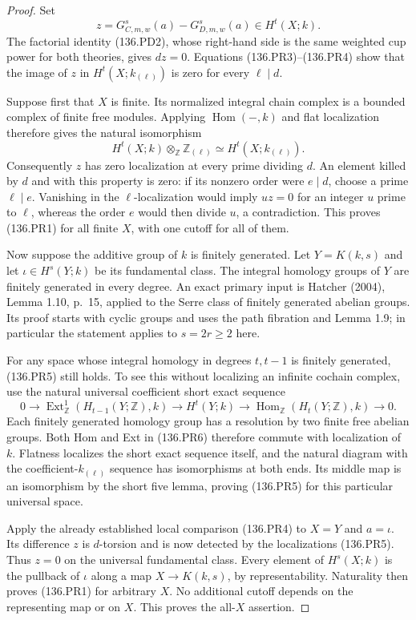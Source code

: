 \begin{proof}
Set
\[
                  z=G_{C,m,w}^{s}(a)-G_{D,m,w}^{s}(a)
                               \in H^t(X;k).
\]
The factorial identity (136.PD2), whose right-hand
side is the same weighted cup power for both
theories, gives $dz=0$. Equations (136.PR3)--(136.PR4)
show that the image of $z$ in
$H^t(X;k_{(\ell)})$ is zero for every $\ell\mid d$.

Suppose first that $X$ is finite. Its normalized
integral chain complex is a bounded complex of
finite free modules. Applying $\operatorname{Hom}(-,k)$
and flat localization therefore gives the natural
isomorphism
\[
 H^t(X;k)\otimes_{\mathbb Z}\mathbb Z_{(\ell)}
                         \simeq H^t(X;k_{(\ell)}).
                                                               \tag{136.PR5}
\]
Consequently $z$ has zero localization at every
prime dividing $d$. An element killed by $d$ and
with this property is zero: if its nonzero order
were $e\mid d$, choose a prime $\ell\mid e$.
Vanishing in the $\ell$-localization would imply
$u z=0$ for an integer $u$ prime to $\ell$, whereas
the order $e$ would then divide $u$, a contradiction.
This proves (136.PR1) for all finite $X$, with one
cutoff for all of them.

Now suppose the additive group of $k$ is finitely
generated. Let $Y=K(k,s)$ and let
$\iota\in H^s(Y;k)$ be its fundamental class.
The integral homology groups of $Y$ are finitely
generated in every degree. An exact primary input
is Hatcher (2004), Lemma 1.10, p.~15, applied to
the Serre class of finitely generated abelian
groups. Its proof starts with cyclic groups and
uses the path fibration and Lemma 1.9; in particular
the statement applies to $s=2r\ge2$ here.

For any space whose integral homology in degrees
$t,t-1$ is finitely generated, (136.PR5) still
holds. To see this without localizing an infinite
cochain complex, use the natural universal
coefficient short exact sequence
\[
 0\to\operatorname{Ext}_{\mathbb Z}^1(H_{t-1}(Y;\mathbb Z),k)
  \to H^t(Y;k)
  \to\operatorname{Hom}_{\mathbb Z}(H_t(Y;\mathbb Z),k)\to0.
                                                               \tag{136.PR6}
\]
Each finitely generated homology group has a
resolution by two finite free abelian groups.
Both Hom and Ext in (136.PR6) therefore commute
with localization of $k$. Flatness localizes the
short exact sequence itself, and the natural
diagram with the coefficient-$k_{(\ell)}$ sequence
has isomorphisms at both ends. Its middle map is
an isomorphism by the short five lemma, proving
(136.PR5) for this particular universal space.

Apply the already established local comparison
(136.PR4) to $X=Y$ and $a=\iota$. Its difference
$z$ is $d$-torsion and is now detected by the
localizations (136.PR5). Thus $z=0$ on the
universal fundamental class. Every element of
$H^s(X;k)$ is the pullback of $\iota$ along a map
$X\to K(k,s)$, by representability. Naturality
then proves (136.PR1) for arbitrary $X$. No
additional cutoff depends on the representing
map or on $X$. This proves the all-$X$ assertion.
\end{proof}

